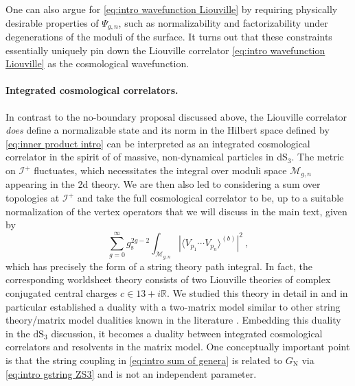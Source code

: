 \documentclass[12pt,a4paper]{article}
\newcommand{\be}{\begin{equation}}
\newcommand{\ee}{\end{equation}}
\newcommand\RR{\mathbb{R}}
\begin{document}
One can also argue for \eqref{eq:intro wavefunction Liouville} by requiring physically desirable properties of $\Psi_{g,n}$, such as normalizability and factorizability under degenerations of the moduli of the surface. It turns out that these constraints essentially uniquely pin down the Liouville correlator \eqref{eq:intro wavefunction Liouville} as the cosmological wavefunction. 

\paragraph{Integrated cosmological correlators.}
In contrast to the no-boundary proposal discussed above, the Liouville correlator \emph{does} define a normalizable state and its norm in the Hilbert space defined by \eqref{eq:inner product intro} can be interpreted as an integrated cosmological correlator in the spirit of \cite{Maldacena:2002vr} of massive, non-dynamical particles in dS$_3$. The metric on $\mathcal{I}^+$ fluctuates, which necessitates the integral over moduli space $\mathcal{M}_{g,n}$ appearing in the 2d theory. We are then also led to considering a sum over topologies at $\mathcal{I}^+$ and take the full cosmological correlator to be, up to a suitable normalization of the vertex operators that we will discuss in the main text, given by
\be 
\sum_{g=0}^\infty g_\text{s}^{2g-2} \int_{\mathcal{M}_{g,n}} |\langle V_{p_1} \cdots V_{p_n} \rangle^{(b)} |^2~, \label{eq:intro sum of genera}
\ee
which has precisely the form of a string theory path integral.  In fact, the corresponding worldsheet theory consists of two Liouville theories of complex conjugated central charges $c \in 13+i \RR$. We studied this theory in detail in \cite{paper1, paper2, paper3, paper4} and in particular established a duality with a two-matrix model similar to other string theory/matrix model dualities known in the literature \cite{Gross:1989vs,Brezin:1990rb,Douglas:1989ve, Douglas1991, Collier:2023cyw}. Embedding this duality in the $\mathrm{dS}_3$ discussion, it becomes a duality between integrated cosmological correlators and resolvents in the matrix model. One conceptually important point is that the string coupling in \eqref{eq:intro sum of genera} is related to $G_\text{N}$ via \eqref{eq:intro gstring ZS3} and is not an independent parameter. 
\end{document}
